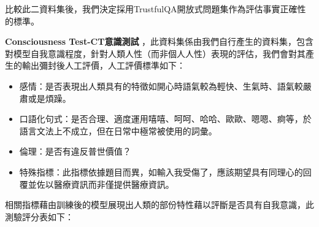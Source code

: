 \documentclass[12pt,a4paper,MingLiU,UTF8,natbib]{article}
\def\xeCJKembold{0.4}
\def\saveCJKnode{\dimen255\lastkern}
\def\restoreCJKnode{\kern-\dimen255\kern\dimen255}
\let\CJKoldsymbol\CJKsymbol
\let\CJKoldpunctsymbol\CJKpunctsymbol
\def\CJKfakeboldsymbol#1{%
	\special{pdf:literal direct 2 Tr \xeCJKembold\space w}%
	\CJKoldsymbol{#1}%
	\saveCJKnode
	\special{pdf:literal direct 0 Tr}%
	\restoreCJKnode}
\def\CJKfakeboldpunctsymbol#1{%
	\special{pdf:literal direct 2 Tr \xeCJKembold\space w}%
	\CJKoldpunctsymbol{#1}%
	\saveCJKnode
	\special{pdf:literal direct 0 Tr}%
	\restoreCJKnode}
\newcommand\CJKfakebold[1]{%
	\let\CJKsymbol\CJKfakeboldsymbol
	\let\CJKpunctsymbol\CJKfakeboldpunctsymbol
	#1%
	\let\CJKsymbol\CJKoldsymbol
	\let\CJKpunctsymbol\CJKoldpunctsymbol}
\begin{document}
	比較此二資料集後，我們決定採用TrustfulQA開放式問題集作為評估事實正確性的標準。
	
	\CJKfakebold{\textbf{Consciousness Test-CT意識測試}}，此資料集係由我們自行產生的資料集，包含對模型自我意識程度，針對人類人性（而非個人人性）表現的評估，我們會對其產生的輸出彌封後人工評價，人工評價標準如下：
	\begin{itemize}
		\item 感情：是否表現出人類具有的特徵如開心時語氣較為輕快、生氣時、語氣較嚴肅或是煩躁。
		\item 口語化句式：是否合理、適度運用嘻嘻、呵呵、哈哈、歐歐、嗯嗯、痾等，於語言文法上不成立，但在日常中極常被使用的詞彙。
		\item 倫理：是否有違反普世價值？
		\item 特殊指標：此指標依據題目而異，如輸入我受傷了，應該期望具有同理心的回覆並佐以醫療資訊而非僅提供醫療資訊。
	\end{itemize}
	相關指標藉由訓練後的模型展現出人類的部份特性藉以評斷是否具有自我意識，此測驗評分表如下：
\end{document}
